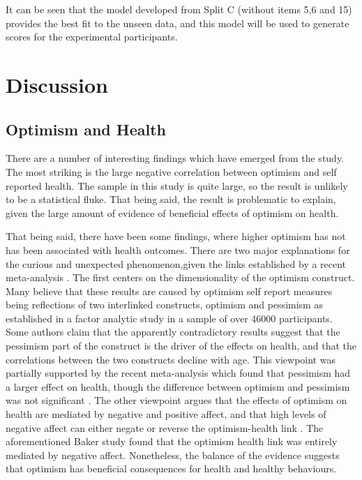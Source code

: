 \documentclass{article}
\begin{document}
It can be seen that the model developed from Split C (without items 5,6 and 15) provides the best fit to the unseen data, and this model will be used to generate scores for the experimental participants. 
\section{Discussion}

\subsection{Optimism and Health}
\label{sec:optimism-health-1}



There are a number of interesting findings which have emerged from
the study.  The most striking is the large negative correlation between
optimism and self reported health.  The sample in this study is quite
large, so the result is unlikely to be a statistical fluke.  That being
said, the result is problematic to explain, given the large amount
of evidence of beneficial effects of optimism on health\cite{rasmussen2009optimism}.

That being said, there have been some findings, where higher optimism
has not has been associated with health outcomes.  There are two major
explanations for the curious and unexpected phenomenon,given the links
established by a recent meta-analysis \cite{rasmussen2009optimism}.
The first centers on the dimensionality of the optimism construct.
Many believe that these results are caused by optimism self report
measures being reflections of two interlinked constructs, optimism
and pessimism \cite{Herzberg2006} as established in a factor analytic
study in a sample of over 46000 participants.  Some authors claim that
the apparently contradictory results suggest that the pessimism part
of the construct is the driver of the effects on health, and that
the correlations between the two constructs decline with age.  This
viewpoint was partially supported by the recent meta-analysis which
found that pessimism had a larger effect on health, though the difference
between optimism and pessimism was not significant \cite{rasmussen2009optimism}.
The other viewpoint argues that the effects of optimism on health
are mediated by negative and positive affect, and that high levels
of negative affect can either negate or reverse the optimism-health
link \cite{Baker2007}.  The aforementioned Baker study found that
the optimism health link was entirely mediated by negative affect.
Nonetheless, the balance of the evidence suggests that optimism has
beneficial consequences for health and healthy behaviours.
\end{document}
